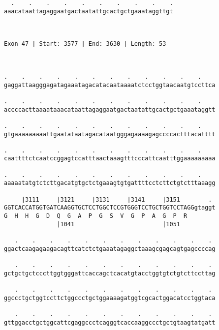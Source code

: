 \documentclass{article}
\begin{document}
\begin{Verbatim}
  .    .    .    .    .    .    .    .    .    .
aaacataattagaggaatgactaatattgcactgctgaaataggttgt
                                                
                                                
 
Exon 47 | Start: 3577 | End: 3630 | Length: 53



.    .    .    .    .    .    .    .    .    .    .    .    
gaggattaagggagatagaaatagacatacaataaaatctcctggtaacaatgtccttca
                                                            
.    .    .    .    .    .    .    .    .    .    .    .    
accccacttaaaataaacataattagaggaatgactaatattgcactgctgaaataggtt
                                                            
.    .    .    .    .    .    .    .    .    .    .    .    
gtgaaaaaaaaattgaatataatagacataatgggagaaaagagccccactttacatttt
                                                            
.    .    .    .    .    .    .    .    .    .    .    .    
caattttctcaatccggagtccatttaactaaagtttcccattcaatttggaaaaaaaaa
                                                            
.    .    .    .    .    .    .    .    .    .    .    .    
aaaaatatgtctcttgacatgtgctctgaaagtgtgattttcctcttctgtctttaaagg
                                                            
     |3111     |3121     |3131     |3141     |3151        . 
GGTCACCATGGTGATCAAGGTGCTCCTGGCTCCGTGGGTCCTGCTGGTCCTAGGgtaggt
G  H  H  G  D  Q  G  A  P  G  S  V  G  P  A  G  P  R        
               |1041                         |1051          
  
   .    .    .    .    .    .    .    .    .    .    .    . 
ggactcaagagaagacagttcatctctgaaatagaggctaaagcgagcagtgagccccag
                                                            
   .    .    .    .    .    .    .    .    .    .    .    . 
gctgctgctcccttggtgggattcaccagctcacatgtacctggtgtctgtcttccttag
                                                            
   .    .    .    .    .    .    .    .    .    .    .    . 
ggccctgctggtccttctggccctgctggaaaagatggtcgcactggacatcctggtaca
                                                            
   .    .    .    .    .    .    .    .    .    .    .    . 
gttggacctgctggcattcgaggccctcagggtcaccaaggccctgctgtaagtatgatt
                                                            

\end{Verbatim}
\end{document}

